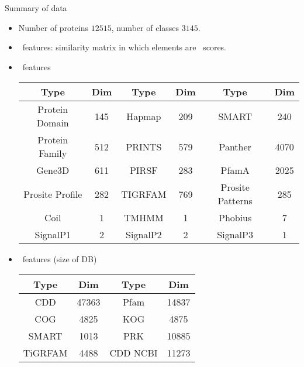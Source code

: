 \documentclass[first=dgreen,second=purple,logo=yellowexc]{aaltoslides}
\begin{document}
\begin{frame}{Summary of data}
	\begin{itemize}
		\item Number of proteins $12515$, number of classes $3145$.
		\item \blast\ features: similarity matrix in which elements are \blast\ scores.
		\item \interproscan\ features\\
		{\scriptsize\begin{tabular}{|c|c||c|c||c|c|}\hline
		 Type & Dim & Type & Dim & Type & Dim  \\ \hline
		 Protein Domain & 145 & Hapmap & 209 & SMART & 240 \\
		 Protein Family & 512 & PRINTS & 579 & Panther & 4070 \\
		 Gene3D & 611 & PIRSF & 283 & PfamA & 2025 \\
		 Prosite Profile & 282  & TIGRFAM & 769 & Prosite Patterns & 285\\
		 Coil & 1 & TMHMM& 1& Phobius &7 \\
		 SignalP1& 2& SignalP2 & 2 & SignalP3 & 1\\\hline
		\end{tabular}}
		\item \pssm\ features (size of DB)\\
		{\scriptsize\begin{tabular}{|c|c||c|c|}\hline
		 Type & Dim & Type & Dim \\ \hline
		 CDD & 47363 & Pfam & 14837\\
		 COG & 4825  & KOG  & 4875 \\
		 SMART & 1013 & PRK & 10885 \\
		 TiGRFAM & 4488  & CDD NCBI & 11273\\ \hline
		\end{tabular}}
	\end{itemize}
\end{frame}
\end{document}
